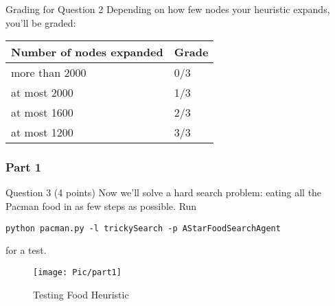 \documentclass{beamer}
\begin{document}
\begin{frame}
  \begin{block}{Grading for Question 2}
Depending on how few nodes your heuristic expands, you'll be graded:

\begin{center}

\begin{tabular}{||l||l||}
  \hline\hline
  Number of nodes expanded & Grade\\
  \hline\hline
  more than 2000 & 0/3\\
  \hline\hline
  at most 2000 & 1/3\\
  \hline\hline
  at most 1600 & 2/3\\
  \hline\hline
  at most 1200 & 3/3\\
  \hline\hline
\end{tabular}
\end{center}
\end{block}
\end{frame}


\begin{frame}
  \frametitle{Part 1}
  \begin{block}{Question 3 (4 points)}
    Now we'll solve a hard search problem: eating all the Pacman food in as few steps as possible. Run \begin{scriptsize}\texttt{python pacman.py -l trickySearch -p AStarFoodSearchAgent}\end{scriptsize} for a test.
    \begin{figure}[ht]
      \centering
      \texttt{[image: Pic/part1]}
      \caption{Testing Food Heuristic}
    \end{figure}
  \end{block}
\end{frame}
\end{document}

